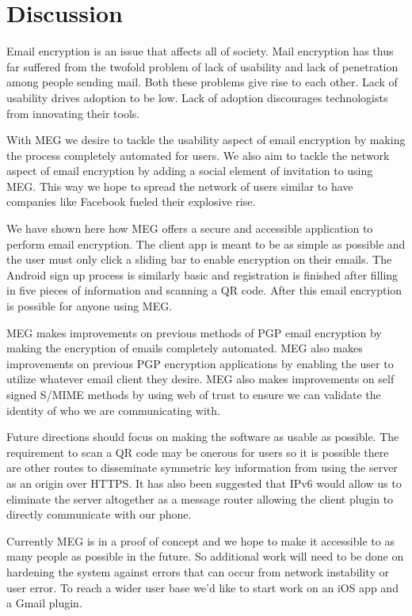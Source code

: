 \documentclass[11pt]{article}
\begin{document}
\section{Discussion}
\par Email encryption is an issue that affects all of society. Mail encryption has thus far suffered from the twofold problem of lack of usability and lack of penetration among people sending mail. Both these problems give rise to each other. Lack of usability drives adoption to be low. Lack of adoption discourages technologists from innovating their tools.
\par With MEG we desire to tackle the usability aspect of email encryption by making the process completely automated for users. We also aim to tackle the network aspect of email encryption by adding a social element of invitation to using MEG. This way we hope to spread the network of users similar to have companies like Facebook fueled their explosive rise.
\par We have shown here how MEG offers a secure and accessible application to perform email encryption. The client app is meant to be as simple as possible and the user must only click a sliding bar to enable encryption on their emails. The Android sign up process is similarly basic and registration is finished after filling in five pieces of information and scanning a QR code. After this email encryption is possible for anyone using MEG.
\par MEG makes improvements on previous methods of PGP email encryption by making the encryption of emails completely automated. MEG also makes improvements on previous PGP encryption applications by enabling the user to utilize whatever email client they desire. MEG also makes improvements on self signed S/MIME methods by using web of trust to ensure we can validate the identity of who we are communicating with.
\par Future directions should focus on making the software as usable as possible. The requirement to scan a QR code may be onerous for users so it is possible there are other routes to disseminate symmetric key information from using the server as an origin over HTTPS. It has also been suggested that IPv6 would allow us to eliminate the server altogether as a message router allowing the client plugin to directly communicate with our phone.
\par Currently MEG is in a proof of concept and we hope to make it accessible to as many people as possible in the future. So additional work will need to be done on hardening the system against errors that can occur from network instability or user error. To reach a wider user base we'd like to start work on an iOS app and a Gmail plugin.
\end{document}
